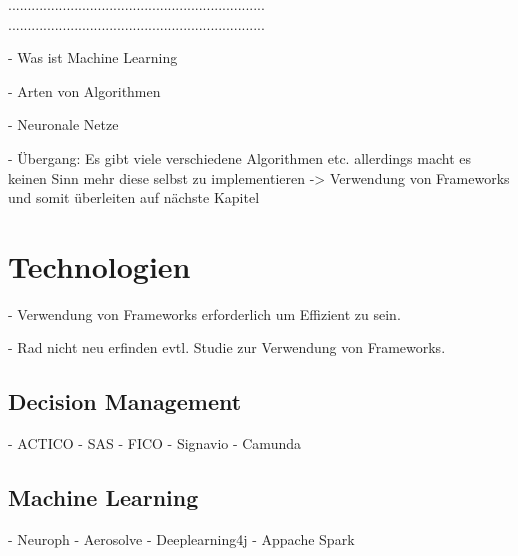 ..................................................................
..................................................................

- Was ist Machine Learning

- Arten von Algorithmen 

- Neuronale Netze 

- Übergang: Es gibt viele verschiedene Algorithmen etc. allerdings macht es keinen Sinn mehr diese selbst zu implementieren -> Verwendung von Frameworks und somit überleiten auf nächste Kapitel

\section{Technologien}
\label{sec:Technologien2}

- Verwendung von Frameworks erforderlich um Effizient zu sein.

- Rad nicht neu erfinden evtl. Studie zur Verwendung von Frameworks.

\subsection{Decision Management}
\label{subsec:Decision_Management2}

- ACTICO 
- SAS
- FICO 
- Signavio
- Camunda

\subsection{Machine Learning}
\label{subsec:Machine_Learning2}

- Neuroph
- Aerosolve 
- Deeplearning4j
- Appache Spark

